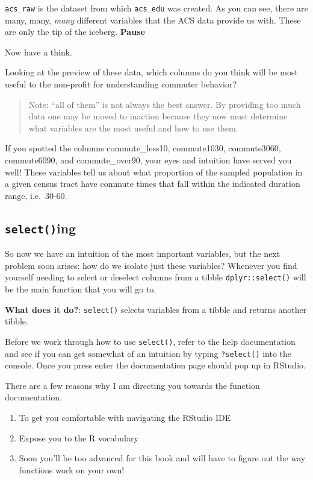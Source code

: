 \documentclass[
]{book}
\providecommand{\tightlist}{%
  \setlength{\itemsep}{0pt}\setlength{\parskip}{0pt}}
\begin{document}
\texttt{acs\_raw} is the dataset from which \texttt{acs\_edu} was created. As you can see, there are many, many, \emph{many} different variables that the ACS data provide us with. These are only the tip of the iceberg.
\textbf{Pause}

Now have a think.

Looking at the preview of these data, which columns do you think will be most useful to the non-profit for understanding commuter behavior?

\begin{quote}
Note: ``all of them'' is not always the best answer. By providing too much data one may be moved to inaction because they now must determine what variables are the most useful and how to use them.
\end{quote}

If you spotted the columns commute\_less10, commute1030, commute3060, commute6090, and commute\_over90, your eyes and intuition have served you well! These variables tell us about what proportion of the sampled population in a given census tract have commute times that fall within the indicated duration range, i.e.~30-60.

\hypertarget{selecting}{%
\subsection{\texorpdfstring{\texttt{select()}ing}{select()ing}}\label{selecting}}

So now we have an intuition of the most important variables, but the next problem soon arises: how do we isolate just these variables? Whenever you find yourself needing to select or deselect columns from a tibble \texttt{dplyr::select()} will be the main function that you will go to.

\textbf{What does it do?}: \texttt{select()} selects variables from a tibble and returns another tibble.

Before we work through how to use \texttt{select()}, refer to the help documentation and see if you can get somewhat of an intuition by typing \texttt{?select()} into the console. Once you press enter the documentation page should pop up in RStudio.

There are a few reasons why I am directing you towards the function documentation.

\begin{enumerate}
\def\labelenumi{\arabic{enumi}.}
\tightlist
\item
  To get you comfortable with navigating the RStudio IDE
\item
  Expose you to the R vocabulary
\item
  Soon you'll be too advanced for this book and will have to figure out the way functions work on your own!
\end{enumerate}
\end{document}

